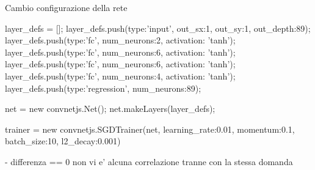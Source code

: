 Cambio configurazione della rete

layer_defs = [];
layer_defs.push({type:'input', out_sx:1, out_sy:1, out_depth:89});
layer_defs.push({type:'fc', num_neurons:2, activation: 'tanh'});
layer_defs.push({type:'fc', num_neurons:6, activation: 'tanh'});
layer_defs.push({type:'fc', num_neurons:6, activation: 'tanh'});
layer_defs.push({type:'fc', num_neurons:4, activation: 'tanh'});
layer_defs.push({type:'regression', num_neurons:89});

net = new convnetjs.Net();
net.makeLayers(layer_defs);

trainer = new convnetjs.SGDTrainer(net, {learning_rate:0.01, momentum:0.1, batch_size:10, l2_decay:0.001})

- differenza == 0  non vi e' alcuna correlazione tranne con la stessa domanda

